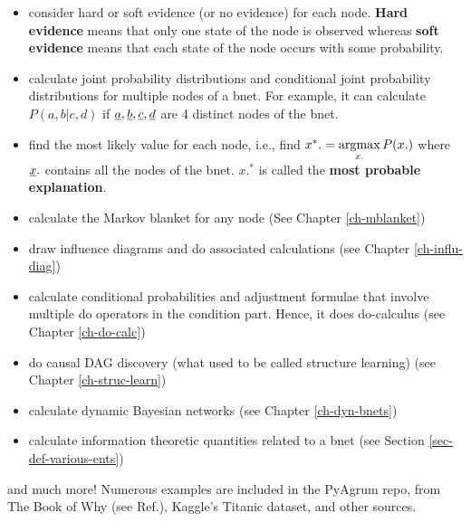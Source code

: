 \begin{itemize}

\item consider hard or soft evidence (or no evidence)
for each node. {\bf Hard evidence} means that only
one state of the node is observed whereas {\bf soft
evidence} means that each state of the node occurs with some probability.


\item calculate joint probability distributions and conditional joint probability distributions for multiple nodes of a bnet.
For example, it can calculate  $P(a,b|c,d)$ if $\rva, \rvb, \rvc, \rvd$ 
are 4  distinct nodes of the bnet.


\item find
the most likely value for each node, i.e., find  $x^*.=\mathop{\mathrm{argmax}}\limits_{x.}P(x.)$ where $\rvx.$ contains
 all the nodes of the bnet. $x.^*$ is called the {\bf most probable explanation}.


\item calculate the Markov blanket for any node (See Chapter \ref{ch-mblanket})

\item draw influence diagrams and do associated calculations (see Chapter \ref{ch-influ-diag})

\item calculate conditional probabilities and adjustment formulae  that involve multiple do operators in the condition part. Hence, it does do-calculus (see Chapter \ref{ch-do-calc})

\item do causal DAG discovery (what used to be called structure learning) (see Chapter \ref{ch-struc-learn})

\item calculate dynamic Bayesian networks (see Chapter \ref{ch-dyn-bnets})

\item calculate information theoretic quantities related to a bnet (see Section \ref{sec-def-various-ents})


\end{itemize}
and much more! Numerous examples are included in the 
PyAgrum repo, from The Book of Why (see Ref.\cite{book-why}), Kaggle's Titanic dataset, and other sources.

